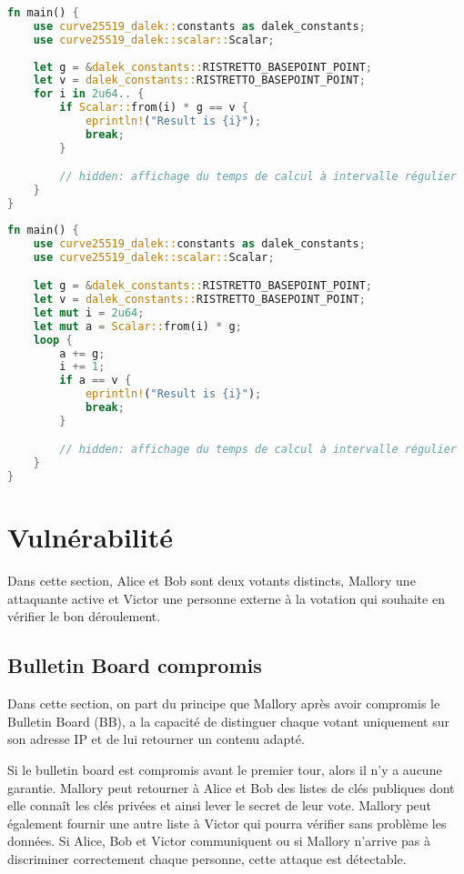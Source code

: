 \documentclass[../report]{subfiles}
\begin{document}
\begin{lstlisting}[language=Rust,caption={Vitesse de calcul résultat final (très naif)},style=numbers,label={lst:perf:resultat-1}]
fn main() {
    use curve25519_dalek::constants as dalek_constants;
    use curve25519_dalek::scalar::Scalar;
        
    let g = &dalek_constants::RISTRETTO_BASEPOINT_POINT;
    let v = dalek_constants::RISTRETTO_BASEPOINT_POINT;
    for i in 2u64.. {
        if Scalar::from(i) * g == v {
            eprintln!("Result is {i}");
            break;
        }

        // hidden: affichage du temps de calcul à intervalle régulier
    }
}
\end{lstlisting}%
\begin{lstlisting}[language=Rust,caption={Vitesse de calcul résultat final (un peu moins naif)},style=numbers,label={lst:perf:resultat-2}]
fn main() {
    use curve25519_dalek::constants as dalek_constants;
    use curve25519_dalek::scalar::Scalar;

    let g = &dalek_constants::RISTRETTO_BASEPOINT_POINT;
    let v = dalek_constants::RISTRETTO_BASEPOINT_POINT;
    let mut i = 2u64;
    let mut a = Scalar::from(i) * g;
    loop {
        a += g;
        i += 1;
        if a == v {
            eprintln!("Result is {i}");
            break;
        }

        // hidden: affichage du temps de calcul à intervalle régulier
    }
}
\end{lstlisting}%

\chapter{Vulnérabilité}

Dans cette section, Alice et Bob sont deux votants distincts, Mallory une attaquante active et Victor une personne externe à la votation qui 
souhaite en vérifier le bon déroulement.

\section{Bulletin Board compromis}

Dans cette section, on part du principe que Mallory après avoir compromis le Bulletin Board (BB), a la capacité
de distinguer chaque votant uniquement sur son adresse IP et de lui retourner un contenu adapté.

Si le bulletin board est compromis avant le premier tour, alors il n'y a aucune garantie.
Mallory peut retourner à Alice et Bob des listes de clés publiques dont elle connaît les clés privées et ainsi lever 
le secret de leur vote. Mallory peut également fournir une autre liste à Victor qui pourra vérifier sans problème les données.
Si Alice, Bob et Victor communiquent ou si Mallory n'arrive pas à discriminer correctement chaque personne, cette attaque est 
détectable.
\end{document}

